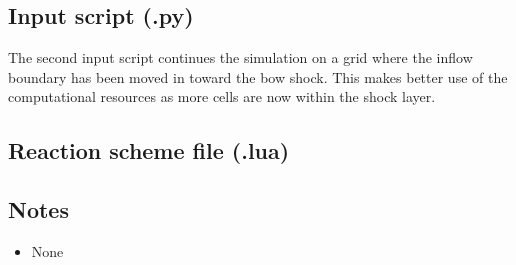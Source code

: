 \subsection{Input script (.py)}
\topbar

\bottombar

\medskip\noindent
The second input script continues the simulation on a grid where the inflow boundary 
has been moved in toward the bow shock.
This makes better use of the computational resources as more cells are now within the shock layer.

\noindent
\topbar

\bottombar

\newpage
\subsection{Reaction scheme file (.lua)}
\label{lehr-reaction-file}
\topbar

\bottombar

\medskip
\subsection{Notes}
\begin{itemize}
\item None
\end{itemize}

